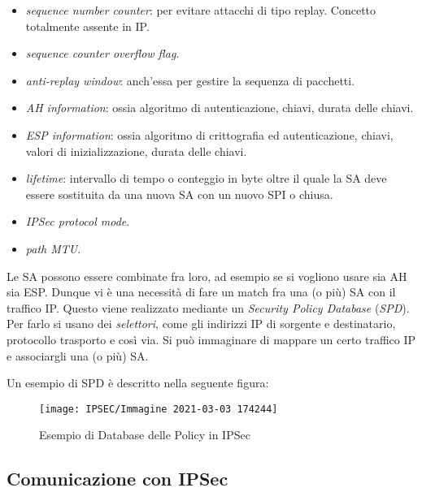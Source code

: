 \documentclass[14pt]{extreport}
\begin{document}
\begin{itemize}
    \item \textit{sequence number counter}: per evitare attacchi di tipo replay. Concetto totalmente assente in IP.
    
    
    \item \textit{sequence counter overflow flag}.
    
    
    \item \textit{anti-replay window}: anch'essa per gestire la sequenza di pacchetti.
    
    
    
    \item \textit{AH information}: ossia algoritmo di autenticazione, chiavi, durata delle chiavi.
    
    
    \item \textit{ESP information}: ossia algoritmo di crittografia ed autenticazione, chiavi, valori di inizializzazione, durata delle chiavi.
    
    
    \item \textit{lifetime}: intervallo di tempo o conteggio in byte oltre il quale la SA deve essere sostituita da una nuova SA con un nuovo SPI o chiusa.
    
    
    \item \textit{IPSec protocol mode}.
    
    
    \item \textit{path MTU}.
\end{itemize}
Le SA possono essere combinate fra loro, ad esempio se si vogliono usare sia AH sia ESP. Dunque vi è una necessità di fare un match fra una (o più) SA con il traffico IP. Questo viene realizzato mediante un \textit{Security Policy Database} (\textit{SPD}). Per farlo si usano dei \textit{selettori}, come gli indirizzi IP di sorgente e destinatario, protocollo trasporto e così via. Si può immaginare di mappare un certo traffico IP e associargli una (o più) SA.

Un esempio di SPD è descritto nella seguente figura:



\begin{figure}[H]
    \centering
    \texttt{[image: IPSEC/Immagine 2021-03-03 174244]}
    \caption{Esempio di Database delle Policy in IPSec}
    \label{IPSEC3}
\end{figure}





\subsection{Comunicazione con IPSec}
\end{document}
